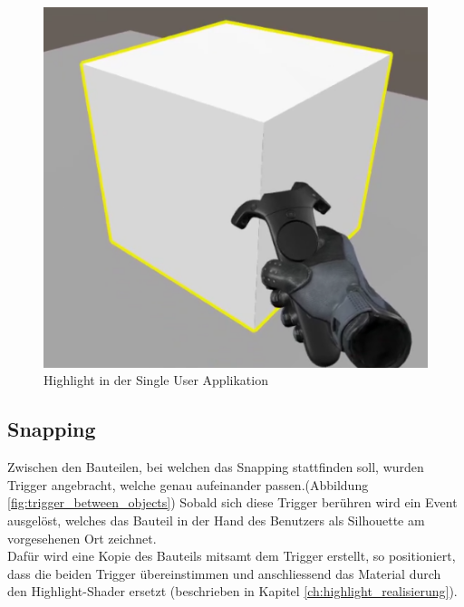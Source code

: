 \begin{figure}[h!]
	\centering
	\includegraphics[keepaspectratio,width=0.4\linewidth]{img/Single_User_Highlight.PNG}
	\caption{Highlight in der Single User Applikation}
	\label{fig:highlight_single_user_application}
\end{figure}

\subsection{Snapping}
Zwischen den Bauteilen, bei welchen das Snapping stattfinden soll, wurden Trigger angebracht, welche genau aufeinander passen.(Abbildung \ref{fig:trigger_between_objects}) Sobald sich diese Trigger berühren wird ein Event ausgelöst, welches das Bauteil in der Hand des Benutzers als Silhouette am vorgesehenen Ort zeichnet. \\
Dafür wird eine Kopie des Bauteils mitsamt dem Trigger erstellt, so positioniert, dass die beiden Trigger übereinstimmen und anschliessend das Material durch den Highlight-Shader ersetzt (beschrieben in Kapitel \ref{ch:highlight_realisierung}).

